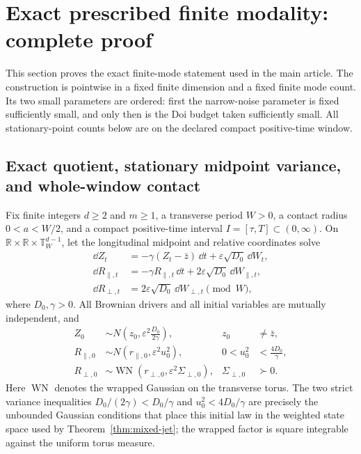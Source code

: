 
\section{Exact prescribed finite modality: complete proof}
\label{sec:exactmfull-proof}

This section proves the exact finite-mode statement used in the main article.
The construction is pointwise in a fixed finite dimension and
a fixed finite mode count.  Its two small parameters are ordered: first the
narrow-noise parameter is fixed sufficiently small, and only then is the Doi
budget taken sufficiently small.  All stationary-point counts below are on
the declared compact positive-time window.

\subsection{Exact quotient, stationary midpoint variance, and whole-window
contact}
\label{subsec:exactmfull-physical}

Fix finite integers \(d\ge2\) and \(m\ge1\), a transverse period \(W>0\), a
contact radius \(0<a<W/2\), and a compact positive-time interval
\(I=[\tau,T]\subset(0,\infty)\).  On
\(\mathbb R\times\mathbb R\times\mathbb T_W^{d-1}\), let the longitudinal
midpoint and relative coordinates solve
\begin{align}
 \dd Z_t&=-\gamma(Z_t-\bar z)\,\dd t
       +\varepsilon\sqrt{D_0}\,\dd W_t,
 \label{eq:exactmfull-midpoint-sde}\\
 \dd R_{\parallel,t}&=-\gamma R_{\parallel,t}\,\dd t
       +2\varepsilon\sqrt{D_0}\,\dd W_{\parallel,t},
 \label{eq:exactmfull-relative-long-sde}\\
 \dd R_{\perp,t}&=2\varepsilon\sqrt{D_0}\,\dd W_{\perp,t}
       \pmod W,
 \label{eq:exactmfull-relative-perp-sde}
\end{align}
where \(D_0,\gamma>0\).  All Brownian drivers and all initial variables are
mutually independent, and
\begin{align}
 Z_0&\sim N\!\left(z_0,\varepsilon^2\frac{D_0}{2\gamma}\right),
 &z_0&\ne\bar z,
 \label{eq:exactmfull-midpoint-initial}\\
 R_{\parallel,0}&\sim
 N(r_{\parallel,0},\varepsilon^2u_0^2),
 &0<u_0^2&<\frac{4D_0}{\gamma},
 \label{eq:exactmfull-relative-long-initial}\\
 R_{\perp,0}&\sim
 \operatorname{WN}(r_{\perp,0},\varepsilon^2\Sigma_{\perp,0}),
 &\Sigma_{\perp,0}&\succ0.
 \label{eq:exactmfull-relative-perp-initial}
\end{align}
Here \(\operatorname{WN}\) denotes the wrapped Gaussian on the transverse
torus.  The two strict variance inequalities
\(D_0/(2\gamma)<D_0/\gamma\) and
\(u_0^2<4D_0/\gamma\) are precisely the unbounded Gaussian conditions that
place this initial law in the weighted state space used by
Theorem~\ref{thm:mixed-jet}; the wrapped factor is square integrable against
the uniform torus measure.

